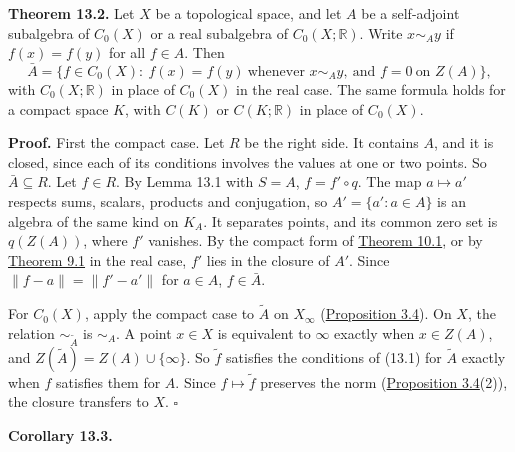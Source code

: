\documentclass[
  english,
  11pt,
  a4paper,
]{article}
\begin{document}
\textbf{Theorem 13.2.} Let \(X\) be a topological space, and let \(A\)
be a self-adjoint subalgebra of \(C_0(X)\) or a real subalgebra of
\(C_0(X;\mathbb R)\). Write \(x\sim_Ay\) if \(f(x)=f(y)\) for all
\(f\in A\). Then
\[\bar A=\{f\in C_0(X):\ f(x)=f(y)\ \text{whenever }x\sim_Ay,\ \text{and }f=0\ \text{on }Z(A)\},
\tag{13.1}\] with \(C_0(X;\mathbb R)\) in place of \(C_0(X)\) in the
real case. The same formula holds for a compact space \(K\), with
\(C(K)\) or \(C(K;\mathbb R)\) in place of \(C_0(X)\).

\textbf{Proof.} First the compact case. Let \(R\) be the right side. It
contains \(A\), and it is closed, since each of its conditions involves
the values at one or two points. So \(\bar A\subseteq R\). Let
\(f\in R\). By Lemma 13.1 with \(S=A\), \(f=f'\circ q\). The map
\(a\mapsto a'\) respects sums, scalars, products and conjugation, so
\(A'=\{a':a\in A\}\) is an algebra of the same kind on \(K_A\). It
separates points, and its common zero set is \(q(Z(A))\), where \(f'\)
vanishes. By the compact form of
\hyperlink{the-stone-weierstrass-theorem-for-functions-vanishing-at-infinity--oa-fnd-sw-09}{Theorem
10.1}, or by
\hyperlink{the-stone-weierstrass-theorem-for-functions-vanishing-at-infinity--oa-fnd-sw-07}{Theorem
9.1} in the real case, \(f'\) lies in the closure of \(A'\). Since
\(\|f-a\|=\|f'-a'\|\) for \(a\in A\), \(f\in\bar A\).

For \(C_0(X)\), apply the compact case to \(\tilde A\) on \(X_\infty\)
(\hyperlink{the-stone-weierstrass-theorem-for-functions-vanishing-at-infinity--oa-fnd-sw-03}{Proposition
3.4}). On \(X\), the relation \(\sim_{\tilde A}\) is \(\sim_A\). A point
\(x\in X\) is equivalent to \(\infty\) exactly when \(x\in Z(A)\), and
\(Z(\tilde A)=Z(A)\cup\{\infty\}\). So \(\tilde f\) satisfies the
conditions of (13.1) for \(\tilde A\) exactly when \(f\) satisfies them
for \(A\). Since \(f\mapsto\tilde f\) preserves the norm
(\hyperlink{the-stone-weierstrass-theorem-for-functions-vanishing-at-infinity--oa-fnd-sw-03}{Proposition
3.4}(2)), the closure transfers to \(X\). \(\square\)

\textbf{Corollary 13.3.}
\end{document}
